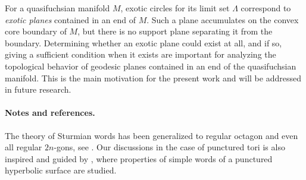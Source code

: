 \documentclass[11pt]{article} %
\theoremstyle{plain}
\theoremstyle{definition}
\numberwithin{equation}{section}
\begin{document}
For a quasifuchsian manifold $M$, exotic circles for its limit set $\Lambda$ correspond to \emph{exotic planes} contained in an end of $M$. Such a plane accumulates on the convex core boundary of $M$, but there is no support plane separating it from the boundary. Determining whether an exotic plane could exist at all, and if so, giving a sufficient condition when it exists are important for analyzing the topological behavior of geodesic planes contained in an end of the quasifuchsian manifold. This is the main motivation for the present work and will be addressed in future research.






\paragraph{Notes and references.}
The theory of Sturmian words has been generalized to regular octagon and even all regular $2n$-gons, see \cite{octagon}. Our discussions in the case of punctured tori is also inspired and guided by \cite{simple}, where properties of simple words of a punctured hyperbolic surface are studied.
\end{document}
